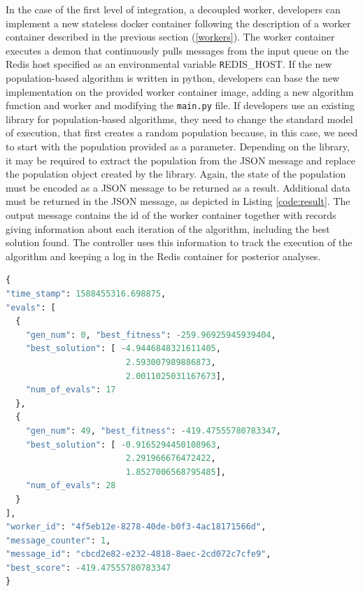 \documentclass[review]{elsarticle}
\begin{document}
In the case of the first level of integration, a decoupled worker, developers
can implement a new stateless docker container following the description of a
worker container described in the previous section (\ref{workers}). The worker
container executes a demon that continuously pulls messages from the input queue
on the Redis host specified as an environmental variable {\texttt REDIS\_HOST}. If the new
population-based algorithm is written in python, developers can base the new
implementation on the provided worker container image, adding a new algorithm
function and worker and modifying the \texttt{main.py} file.
If developers use an existing library for population-based algorithms, they need
to change the standard model of execution, that first creates a random
population because, in this case, we need to start with the population provided
as a parameter. Depending on the library, %
it may be required to extract the population from the JSON message and replace
the population object created by the library. Again, the state of 
the population must be encoded as a JSON message to
be returned as a result. Additional data
must be returned in the JSON message, %
as depicted in  Listing \ref{code:result}. 
The output message contains the id of the worker container together
with records giving information about each iteration of the algorithm, 
including the best solution found. The controller uses this information 
to track the execution of the algorithm and keeping a log in the Redis 
container for posterior analyses.  %

\begin{lstlisting}[language=Python, caption=Fragment of output message, label=code:result ]
{
"time_stamp": 1588455316.698875,
"evals": [
  {
    "gen_num": 0, "best_fitness": -259.96925945939404,
    "best_solution": [ -4.9446848321611405, 
                        2.593007989886873, 
                        2.0011025031167673],
    "num_of_evals": 17
  },
  {
    "gen_num": 49, "best_fitness": -419.47555780783347,
    "best_solution": [ -0.9165294450108963, 
                        2.291966676472422, 
                        1.8527006568795485],
    "num_of_evals": 28
  }
],
"worker_id": "4f5eb12e-8278-40de-b0f3-4ac18171566d",
"message_counter": 1,
"message_id": "cbcd2e82-e232-4818-8aec-2cd072c7cfe9",
"best_score": -419.47555780783347
}
\end{lstlisting}
\end{document}
